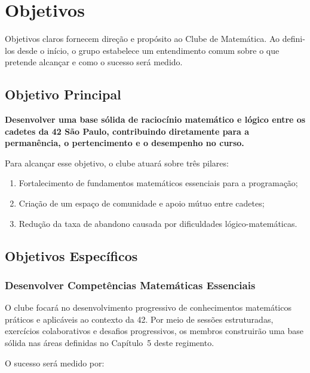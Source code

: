 \clearpage

\section{Objetivos}

Objetivos claros fornecem direção e propósito ao Clube de Matemática. Ao defini-los desde
o início, o grupo estabelece um entendimento comum sobre o que pretende alcançar e como o
sucesso será medido.

\subsection{Objetivo Principal}

\begin{infobox}
  \textbf{Desenvolver uma base sólida de raciocínio matemático e lógico entre os cadetes
  da 42 São Paulo, contribuindo diretamente para a permanência, o pertencimento e o
  desempenho no curso.}
\end{infobox}

Para alcançar esse objetivo, o clube atuará sobre três pilares:

\begin{enumerate}
  \item Fortalecimento de fundamentos matemáticos essenciais para a programação;
  \item Criação de um espaço de comunidade e apoio mútuo entre cadetes;
  \item Redução da taxa de abandono causada por dificuldades lógico-matemáticas.
\end{enumerate}

\subsection{Objetivos Específicos}

\subsubsection{Desenvolver Competências Matemáticas Essenciais}

O clube focará no desenvolvimento progressivo de conhecimentos matemáticos práticos e
aplicáveis ao contexto da 42. Por meio de sessões estruturadas, exercícios colaborativos e
desafios progressivos, os membros construirão uma base sólida nas áreas definidas no
Capítulo~5 deste regimento.

O sucesso será medido por:

